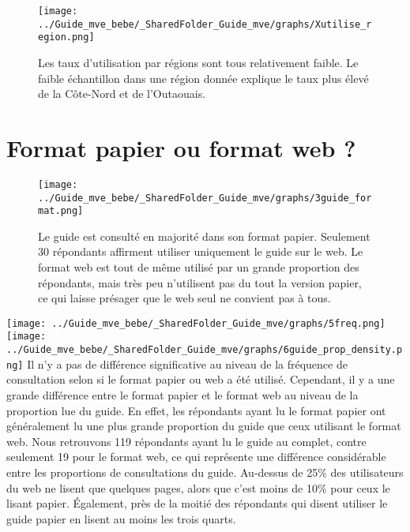 \documentclass[
]{article}
\begin{document}
\begin{figure}[htbp]
  \centering
  \begin{minipage}{0.9\textwidth}
    \texttt{[image: ../Guide\_mve\_bebe/\_SharedFolder\_Guide\_mve/graphs/Xutilise\_region.png]}
  \end{minipage}%
  \begin{minipage}{0.1\textwidth}
    \textbf{} Les taux d'utilisation par régions sont tous relativement faible. Le faible échantillon dans une région donnée explique le taux plus élevé de la Côte-Nord et de l'Outaouais.
  \end{minipage}
\end{figure}

\newpage

\hypertarget{format-papier-ou-format-web}{%
\section{Format papier ou format web
?}\label{format-papier-ou-format-web}}

\begin{figure}[htbp]
  \centering
  \begin{minipage}{0.7\textwidth}
    \texttt{[image: ../Guide\_mve\_bebe/\_SharedFolder\_Guide\_mve/graphs/3guide\_format.png]}
  \end{minipage}%
  \begin{minipage}{0.3\textwidth}
    \textbf{} Le guide est consulté en majorité dans son format papier. Seulement 30 répondants affirment utiliser uniquement le guide sur le web. Le format web est tout de même utilisé par un grande proportion des répondants, mais très peu n’utilisent pas du tout la version papier, ce qui laisse présager que le web seul ne convient pas à tous.
  \end{minipage}
\end{figure}
\newpage

\texttt{[image: ../Guide\_mve\_bebe/\_SharedFolder\_Guide\_mve/graphs/5freq.png]}
\newline
\texttt{[image: ../Guide\_mve\_bebe/\_SharedFolder\_Guide\_mve/graphs/6guide\_prop\_density.png]}
\newline Il n'y a pas de différence significative au niveau de la
fréquence de consultation selon si le format papier ou web a été
utilisé. Cependant, il y a une grande différence entre le format papier
et le format web au niveau de la proportion lue du guide. En effet, les
répondants ayant lu le format papier ont généralement lu une plus grande
proportion du guide que ceux utilisant le format web. Nous retrouvons
119 répondants ayant lu le guide au complet, contre seulement 19 pour le
format web, ce qui représente une différence considérable entre les
proportions de consultations du guide. Au-dessus de 25\% des
utilisateurs du web ne lisent que quelques pages, alors que c'est moins
de 10\% pour ceux le lisant papier. Également, près de la moitié des
répondants qui disent utiliser le guide papier en lisent au moins les
trois quarts.
\end{document}
